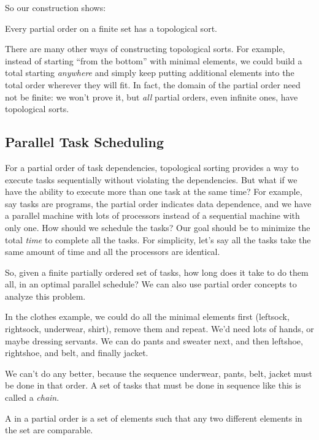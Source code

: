 So our construction shows:

\begin{theorem}\label{thm:topological}
Every partial order on a finite set has a topological sort.
\end{theorem}

There are many other ways of constructing topological sorts.  For example,
instead of starting ``from the bottom'' with minimal elements, we could
build a total starting \emph{anywhere} and simply keep putting additional
elements into the total order wherever they will fit.  In fact, the domain
of the partial order need not be finite: we won't prove it, but \emph{all}
partial orders, even infinite ones, have topological sorts.

\subsection{Parallel Task Scheduling}

For a partial order of task dependencies, topological sorting provides a
way to execute tasks sequentially without violating the dependencies.  But
what if we have the ability to execute more than one task at the same
time?  For example, say tasks are programs, the partial order indicates
data dependence, and we have a parallel machine with lots of processors
instead of a sequential machine with only one.  How should we schedule the
tasks?  Our goal should be to minimize the total \emph{time} to complete
all the tasks.  For simplicity, let's say all the tasks take the same
amount of time and all the processors are identical.

So, given a finite partially ordered set of tasks, how long does it take
to do them all, in an optimal parallel schedule?  We can also use partial
order concepts to analyze this problem.

In the clothes example, we could do all the minimal elements first
(leftsock, rightsock, underwear, shirt), remove them and repeat.  We'd need
lots of hands, or maybe dressing servants.  We can do pants and sweater
next, and then leftshoe, rightshoe, and belt, and finally jacket.

We can't do any better, because the sequence underwear, pants, belt,
jacket must be done in that order.  A set of tasks that must be done in
sequence like this is called a \emph{chain}.

\begin{definition}
A  in a partial order is a set of elements such that any two
different elements in the set are comparable.
\end{definition}

